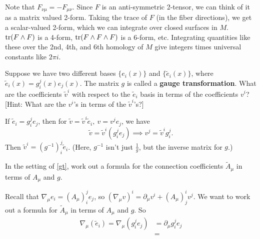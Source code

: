 Note that $F_{\nu\mu}=-F_{\mu\nu}$. Since $F$ is an anti-symmetric 2-tensor, we can think of it as a matrix valued 2-form. Taking the trace of $F$ (in the fiber directions), we get a scalar-valued 2-form, which we can integrate over closed surfaces in $M$. $\operatorname{tr} (F\wedge F)$ is a 4-form, $\operatorname{tr} (F\wedge F\wedge F)$ is a 6-form, etc. Integrating quantities like these over the 2nd, 4th, and 6th homology of $M$ give integers times universal constants like $2\pi i$.

\begin{problem}\label{gt} 
    Suppose we have two different bases $\{e_i (x)\} $ and $\{\widetilde e_i (x)\} $, where $\widetilde e_i (x)=g_i ^j (x)e_j (x)$. The matrix $g$ is called a \textbf{gauge transformation}. What are the coefficients $\widetilde v^i $ with respect to the $\widetilde e_i $ basis in terms of the coefficients $v^i $? [Hint: What are the $v^i $'s in terms of the $\widetilde v^i $'s?]
\end{problem}
\begin{solution}
    If $\widetilde e_i =g_i ^j  e_j $, then for $\widetilde v=\widetilde v^i \widetilde e_i ,\ v=v^j e_j $, we have \[
        \widetilde v=\widetilde v^i (g_i ^j e_j ) \implies  v^j = \widetilde v^i g_i ^j .
    \] Then $\widetilde v^i =(g^{-1})^j _i \widetilde e_i $. (Here, $g^{-1}$ isn't just $\frac{1}{g}$, but the inverse matrix for $g$.)
\end{solution}
\begin{problem}
    In the setting of \cref{gt}, work out a formula for the connection coefficients $\widetilde A_{\mu}$ in terms of $A_{\mu}$ and $g$.
\end{problem}
\begin{solution}
    Recall that $\nabla_{\mu}e_i =(A_{\mu})_i ^j e_j $, so $(\nabla_{\mu}v)^i =\partial _{\mu}v^i +(A_{\mu})^i _j v^j $. We want to work out a formula for $\widetilde A_{\mu}$ in terms of $A_{\mu}$ and $g$. So
    \begin{align*}
        \nabla_{\mu}( \widetilde e_i )=\nabla_{\mu}(g_i ^j e_j )&=\partial _{\mu}g^j _i e_j \\
                                                                &=
    \end{align*}
\end{solution}
